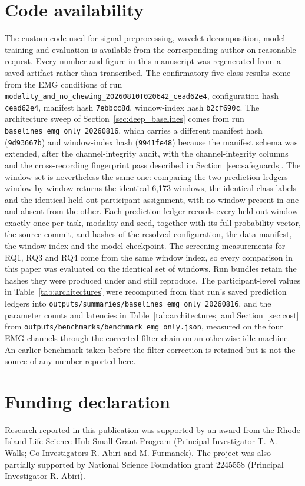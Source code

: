\documentclass[pdflatex,sn-nature,iicol]{sn-jnl}
\begin{document}
\section*{Code availability}
The custom code used for signal preprocessing, wavelet decomposition, model training and evaluation is available from the corresponding author on reasonable request. Every number and figure in this manuscript was regenerated from a saved artifact rather than transcribed. The confirmatory five-class results come from the EMG conditions of run \texttt{modality\_and\_no\_chewing\_}\allowbreak\texttt{20260810T020642\_cead62e4}, configuration hash \texttt{cead62e4}, manifest hash \texttt{7ebbcc8d}, window-index hash \texttt{b2cf690c}. The architecture sweep of Section~\ref{sec:deep_baselines} comes from run \texttt{baselines\_emg\_only\_20260816}, which carries a different manifest hash (\texttt{9d93667b}) and window-index hash (\texttt{9941fe48}) because the manifest schema was extended, after the channel-integrity audit, with the channel-integrity columns and the cross-recording fingerprint pass described in Section~\ref{sec:safeguards}. The window set is nevertheless the same one: comparing the two prediction ledgers window by window returns the identical 6,173 windows, the identical class labels and the identical held-out-participant assignment, with no window present in one and absent from the other. Each prediction ledger records every held-out window exactly once per task, modality and seed, together with its full probability vector, the source commit, and hashes of the resolved configuration, the data manifest, the window index and the model checkpoint. The screening measurements for RQ1, RQ3 and RQ4 come from the same window index, so every comparison in this paper was evaluated on the identical set of windows. Run bundles retain the hashes they were produced under and still reproduce. The participant-level values in Table~\ref{tab:architectures} were recomputed from that run's saved prediction ledgers into \texttt{outputs/}\allowbreak\texttt{summaries/}\allowbreak\texttt{baselines\_emg\_only\_}\allowbreak\texttt{20260816}, and the parameter counts and latencies in Table~\ref{tab:architectures} and Section~\ref{sec:cost} from \texttt{outputs/benchmarks/}\allowbreak\texttt{benchmark\_emg\_only.json}, measured on the four EMG channels through the corrected filter chain on an otherwise idle machine. An earlier benchmark taken before the filter correction is retained but is not the source of any number reported here.

\section*{Funding declaration}
Research reported in this publication was supported by an award from the Rhode Island Life Science Hub Small Grant Program (Principal Investigator T. A. Walls; Co-Investigators R. Abiri and M. Furmanek). The project was also partially supported by National Science Foundation grant 2245558 (Principal Investigator R. Abiri).
\end{document}
